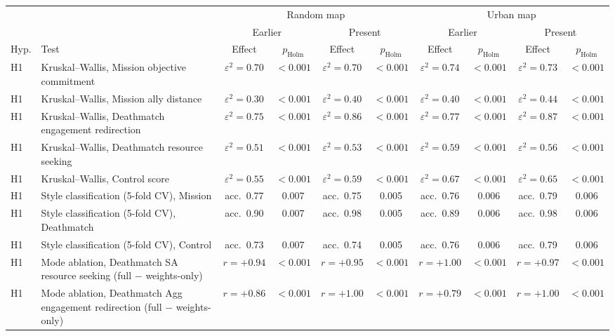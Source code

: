 \begin{tabular}{llcccccccc}
\toprule
 & & \multicolumn{4}{c}{Random map} & \multicolumn{4}{c}{Urban map} \\
\cmidrule(lr){3-6}\cmidrule(lr){7-10}
 & & \multicolumn{2}{c}{Earlier} & \multicolumn{2}{c}{Present} & \multicolumn{2}{c}{Earlier} & \multicolumn{2}{c}{Present} \\
Hyp. & Test & Effect & $p_{\mathrm{Holm}}$ & Effect & $p_{\mathrm{Holm}}$ & Effect & $p_{\mathrm{Holm}}$ & Effect & $p_{\mathrm{Holm}}$ \\
\midrule
H1 & Kruskal--Wallis, Mission objective commitment & $\varepsilon^2=0.70$ & $<0.001$ & $\varepsilon^2=0.70$ & $<0.001$ & $\varepsilon^2=0.74$ & $<0.001$ & $\varepsilon^2=0.73$ & $<0.001$ \\
H1 & Kruskal--Wallis, Mission ally distance & $\varepsilon^2=0.30$ & $<0.001$ & $\varepsilon^2=0.40$ & $<0.001$ & $\varepsilon^2=0.40$ & $<0.001$ & $\varepsilon^2=0.44$ & $<0.001$ \\
H1 & Kruskal--Wallis, Deathmatch engagement redirection & $\varepsilon^2=0.75$ & $<0.001$ & $\varepsilon^2=0.86$ & $<0.001$ & $\varepsilon^2=0.77$ & $<0.001$ & $\varepsilon^2=0.87$ & $<0.001$ \\
H1 & Kruskal--Wallis, Deathmatch resource seeking & $\varepsilon^2=0.51$ & $<0.001$ & $\varepsilon^2=0.53$ & $<0.001$ & $\varepsilon^2=0.59$ & $<0.001$ & $\varepsilon^2=0.56$ & $<0.001$ \\
H1 & Kruskal--Wallis, Control score & $\varepsilon^2=0.55$ & $<0.001$ & $\varepsilon^2=0.59$ & $<0.001$ & $\varepsilon^2=0.67$ & $<0.001$ & $\varepsilon^2=0.65$ & $<0.001$ \\
H1 & Style classification (5-fold CV), Mission & acc.\ 0.77 & 0.007 & acc.\ 0.75 & 0.005 & acc.\ 0.76 & 0.006 & acc.\ 0.79 & 0.006 \\
H1 & Style classification (5-fold CV), Deathmatch & acc.\ 0.90 & 0.007 & acc.\ 0.98 & 0.005 & acc.\ 0.89 & 0.006 & acc.\ 0.98 & 0.006 \\
H1 & Style classification (5-fold CV), Control & acc.\ 0.73 & 0.007 & acc.\ 0.74 & 0.005 & acc.\ 0.76 & 0.006 & acc.\ 0.79 & 0.006 \\
H1 & Mode ablation, Deathmatch SA resource seeking (full $-$ weights-only) & $r=+0.94$ & $<0.001$ & $r=+0.95$ & $<0.001$ & $r=+1.00$ & $<0.001$ & $r=+0.97$ & $<0.001$ \\
H1 & Mode ablation, Deathmatch Agg engagement redirection (full $-$ weights-only) & $r=+0.86$ & $<0.001$ & $r=+1.00$ & $<0.001$ & $r=+0.79$ & $<0.001$ & $r=+1.00$ & $<0.001$ \\

\end{tabular}
